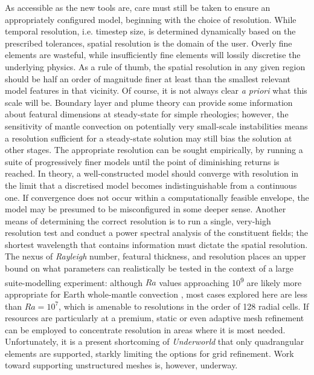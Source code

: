\documentclass[a4paper,11pt,oneside]{book}
\begin{document}
As accessible as the new tools are, care must still be taken to ensure an appropriately configured model, beginning with the choice of resolution. While temporal resolution, i.e. timestep size, is determined dynamically based on the prescribed tolerances, spatial resolution is the domain of the user. Overly fine elements are wasteful, while insufficiently fine elements will lossily discretise the underlying physics. As a rule of thumb, the spatial resolution in any given region should be half an order of magnitude finer at least than the smallest relevant model features in that vicinity. Of course, it is not always clear \textit{a priori} what this scale will be. Boundary layer and plume theory can provide some information about featural dimensions at steady-state for simple rheologies; however, the sensitivity of mantle convection on potentially very small-scale instabilities means a resolution sufficient for a steady-state solution may still bias the solution at other stages. The appropriate resolution can be sought empirically, by running a suite of progressively finer models until the point of diminishing returns is reached. In theory, a well-constructed model should converge with resolution in the limit that a discretised model becomes indistinguishable from a continuous one. If convergence does not occur within a computationally feasible envelope, the model may be presumed to be misconfigured in some deeper sense. Another means of determining the correct resolution is to run a single, very-high resolution test and conduct a power spectral analysis of the constituent fields; the shortest wavelength that contains information must dictate the spatial resolution. The nexus of \textit{Rayleigh} number, featural thickness, and resolution places an upper bound on what parameters can realistically be tested in the context of a large suite-modelling experiment: although $Ra$ values approaching 10\textsuperscript{9} are likely more appropriate for Earth whole-mantle convection \cite{Wolstencroft2009-bz}, most cases explored here are less than $Ra=10^7$, which is amenable to resolutions in the order of 128 radial cells. If resources are particularly at a premium, static or even adaptive mesh refinement can be employed to concentrate resolution in areas where it is most needed. Unfortunately, it is a present shortcoming of \textit{Underworld} that only quadrangular elements are supported, starkly limiting the options for grid refinement. Work toward supporting unstructured meshes is, however, underway.
\end{document}
